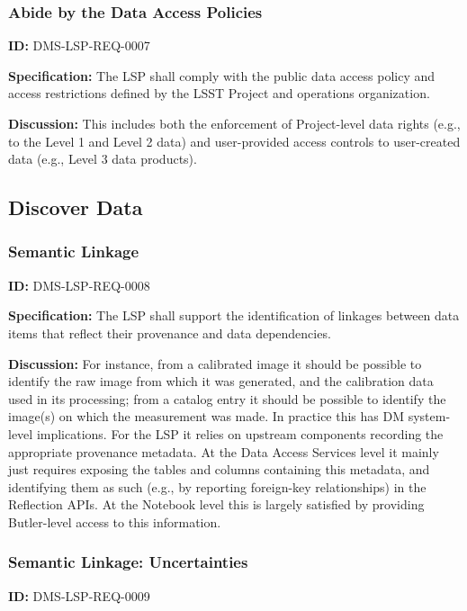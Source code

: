 \documentclass[SE,toc]{lsstdoc}
\begin{document}
\subsubsection{Abide by the Data Access Policies}

\label{DMS-LSP-REQ-0007}
\textbf{ID:} DMS-LSP-REQ-0007

\textbf{Specification:}
The LSP shall comply with the public data access policy and access restrictions defined by the LSST Project and operations organization.

\textbf{Discussion:}
This includes both the enforcement of Project-level data rights (e.g., to the Level 1 and Level 2 data) and user-provided access controls to user-created data (e.g., Level 3 data products).

\subsection{Discover Data}

\subsubsection{Semantic Linkage}

\label{DMS-LSP-REQ-0008}
\textbf{ID:} DMS-LSP-REQ-0008

\textbf{Specification:}
The LSP shall support the identification of linkages between data items that reflect their provenance and data dependencies.

\textbf{Discussion:}
For instance, from a calibrated image it should be possible to identify the raw image from which it was generated, and the calibration data used in its processing; from a catalog entry it should be possible to identify the image(s) on which the measurement was made.
In practice this has DM system-level implications.  For the LSP it relies on upstream components recording the appropriate provenance metadata.  At the Data Access Services level it mainly just requires exposing the tables and columns containing this metadata, and identifying them as such (e.g., by reporting foreign-key relationships) in the Reflection APIs.  At the Notebook level this is largely satisfied by providing Butler-level access to this information.

\subsubsection{Semantic Linkage: Uncertainties}

\label{DMS-LSP-REQ-0009}
\textbf{ID:} DMS-LSP-REQ-0009
\end{document}
